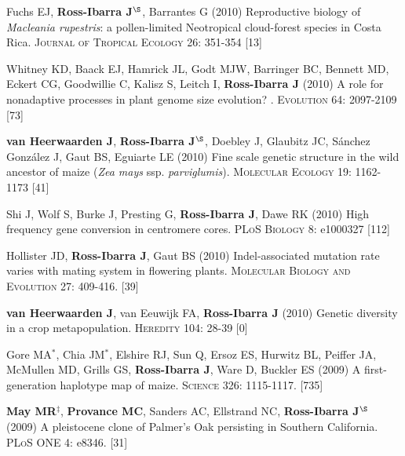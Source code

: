\documentclass[letterpaper,10pt]{article}
\begin{document}
\begin{etaremune}
\item Fuchs EJ, {\bf Ross-Ibarra J}$^\S$, Barrantes G (2010) Reproductive biology of \emph{Macleania rupestris}: a pollen-limited Neotropical cloud-forest species in Costa Rica.  \textsc{Journal of Tropical Ecology} 26: 351-354
 [13]\\


\item Whitney KD, Baack EJ, Hamrick JL, Godt MJW, Barringer BC, Bennett MD, Eckert CG, Goodwillie C, Kalisz S, Leitch I, {\bf Ross-Ibarra J} (2010) A role for nonadaptive processes in plant genome size evolution? . \textsc{Evolution} 64: 2097-2109
 [73]\\


\item {\bf van Heerwaarden J}, {\bf Ross-Ibarra J}$^\S$, Doebley J, Glaubitz JC, S\'{a}nchez Gonz\'{a}lez J, Gaut BS, Eguiarte LE (2010) Fine scale genetic structure in the wild ancestor of maize (\emph{Zea mays} ssp. \emph{parviglumis}).  \textsc{Molecular Ecology} 19: 1162-1173
 [41]\\


\item Shi J, Wolf S, Burke J, Presting G, {\bf Ross-Ibarra J}, Dawe RK (2010) High frequency gene conversion in centromere cores.  \textsc{PLoS Biology} 8: e1000327
 [112]\\


\item Hollister JD, {\bf Ross-Ibarra J}, Gaut BS (2010) Indel-associated mutation rate varies with mating system in flowering plants.  \textsc{Molecular Biology and Evolution} 27: 409-416.
 [39]\\

\item {\bf van Heerwaarden J}, van Eeuwijk FA, {\bf Ross-Ibarra J} (2010) Genetic diversity in a crop metapopulation.  \textsc{Heredity} 104: 28-39
 [0]\\


\item Gore MA$^*$, Chia JM$^*$, Elshire RJ, Sun Q, Ersoz ES, Hurwitz BL, Peiffer JA, McMullen MD, Grills GS, {\bf Ross-Ibarra J}, Ware D, Buckler ES (2009) A first-generation haplotype map of maize.  \textsc{Science 326}: 1115-1117.
 [735]\\


\item {\bf May MR}$^\ddagger$, {\bf Provance MC}, Sanders AC, Ellstrand NC, {\bf Ross-Ibarra J}$^\S$ (2009) A pleistocene clone of Palmer's Oak persisting in Southern California.  \textsc{PLoS ONE} 4: e8346.
 [31]\\



\end{etaremune}
\end{document}
